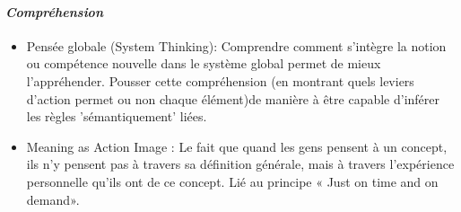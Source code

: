 			\paragraph{\emph{Compréhension}}
		\begin{itemize}
				\item {Pensée globale (System Thinking)}: Comprendre comment s'intègre la notion ou compétence nouvelle dans le système global permet de mieux l'appréhender. Pousser cette compréhension (en montrant quels leviers d'action permet ou non chaque élément)de manière à être capable d'inférer les règles 'sémantiquement' liées.
				\item {Meaning as Action Image} : Le fait que quand les gens pensent à un concept, ils n'y
pensent pas à travers sa définition générale, mais à travers l'expérience personnelle qu'ils ont de ce concept. Lié au principe « Just on time and on demand».
		\end{itemize}	

